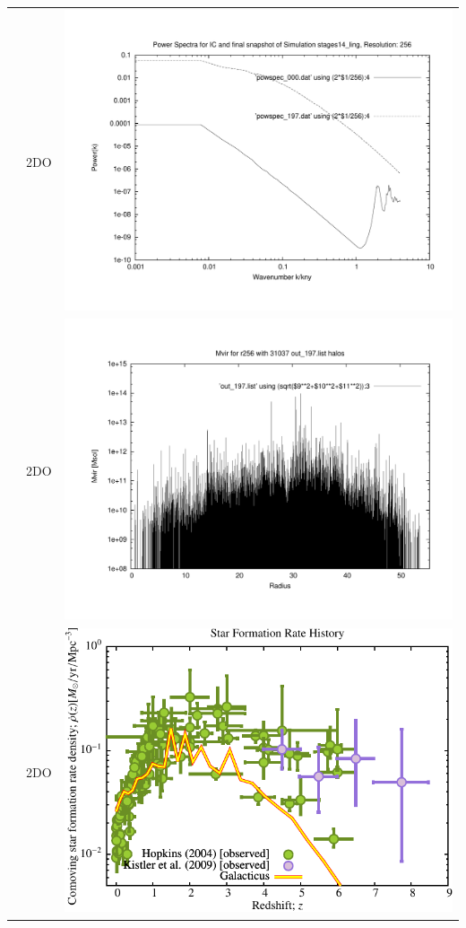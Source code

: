 \documentclass[a4paper,11pt,fleqn,oneside]{book}
\begin{document}
\begin{itemize}
\begin{table}[p]
\begin{tabular}{l|c|c}
 & 2DO & \includegraphics[scale=0.25]{r256/h100/stages14_ling/plot_powspec_stages14_ling.pdf} \\
 & 2DO & \includegraphics[scale=0.25]{r256/h100/stages14_ling/plot_mvir_out_197.pdf} \\
 & 2DO & \includegraphics[scale=0.5]{r256/h100/stages14_ling/Plot_Star_Formation_History.pdf} \\

\end{tabular}
\end{table}
\end{itemize}
\end{document}
